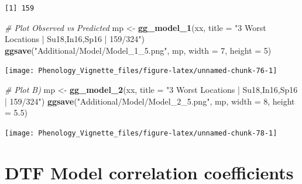 \documentclass[
]{article}
\newenvironment{Shaded}{\begin{snugshade}}{\end{snugshade}}
\newcommand{\CommentTok}[1]{\textcolor[rgb]{0.56,0.35,0.01}{\textit{#1}}}
\newcommand{\DataTypeTok}[1]{\textcolor[rgb]{0.13,0.29,0.53}{#1}}
\newcommand{\DecValTok}[1]{\textcolor[rgb]{0.00,0.00,0.81}{#1}}
\newcommand{\FloatTok}[1]{\textcolor[rgb]{0.00,0.00,0.81}{#1}}
\newcommand{\KeywordTok}[1]{\textcolor[rgb]{0.13,0.29,0.53}{\textbf{#1}}}
\newcommand{\NormalTok}[1]{#1}
\newcommand{\OperatorTok}[1]{\textcolor[rgb]{0.81,0.36,0.00}{\textbf{#1}}}
\newcommand{\StringTok}[1]{\textcolor[rgb]{0.31,0.60,0.02}{#1}}
\begin{document}
\begin{Shaded}
\end{Shaded}

\begin{verbatim}
[1] 159
\end{verbatim}

\begin{Shaded}
\begin{Highlighting}[]
\CommentTok{# Plot Observed vs Predicted}
\NormalTok{mp <-}\StringTok{ }\KeywordTok{gg_model_1}\NormalTok{(xx, }\DataTypeTok{title =} \StringTok{"3 Worst Locations | Su18,In16,Sp16 | 159/324"}\NormalTok{)}
\KeywordTok{ggsave}\NormalTok{(}\StringTok{"Additional/Model/Model_1_5.png"}\NormalTok{, mp, }\DataTypeTok{width =} \DecValTok{7}\NormalTok{, }\DataTypeTok{height =} \DecValTok{5}\NormalTok{)}
\end{Highlighting}
\end{Shaded}

\texttt{[image: Phenology\_Vignette\_files/figure-latex/unnamed-chunk-76-1]}

\begin{Shaded}
\begin{Highlighting}[]
\CommentTok{# Plot B)}
\NormalTok{mp <-}\StringTok{ }\KeywordTok{gg_model_2}\NormalTok{(xx, }\DataTypeTok{title =} \StringTok{"3 Worst Locations | Su18,In16,Sp16 | 159/324"}\NormalTok{)}
\KeywordTok{ggsave}\NormalTok{(}\StringTok{"Additional/Model/Model_2_5.png"}\NormalTok{, mp, }\DataTypeTok{width =} \DecValTok{8}\NormalTok{, }\DataTypeTok{height =} \FloatTok{5.5}\NormalTok{)}
\end{Highlighting}
\end{Shaded}

\texttt{[image: Phenology\_Vignette\_files/figure-latex/unnamed-chunk-78-1]}

\hypertarget{dtf-model-correlation-coefficients}{%
\section{DTF Model correlation
coefficients}\label{dtf-model-correlation-coefficients}}
\end{document}

